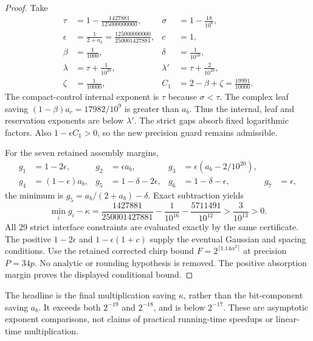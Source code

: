 \begin{proof}
Take
\[
\begin{aligned}
 \tau&=1-\frac{1427881}{125000000000},&\sigma&=1-\frac{18}{10^6},\\
 \epsilon&=\frac1{2+a_b}=\frac{125000000000}{250001427881},&c&=1,\\
 \beta&=\frac1{1000},&\delta&=\frac1{10^{16}},\\
 \lambda&=\tau+\frac1{10^{20}},&\lambda'&=\tau+\frac2{10^{20}},\\
 \zeta&=\frac1{10000},&C_1&=2-\beta+\zeta=\frac{19991}{10000}.
\end{aligned}
\]
The compact-control internal exponent is $\tau$ because $\sigma<\tau$.
The complex leaf saving $(1-\beta)a_c=17982/10^9$ is greater than
$a_b$. Thus the internal, leaf and reservation exponents are below
$\lambda'$. The strict gaps absorb fixed logarithmic factors. Also
$1-\epsilon C_1>0$, so the new precision guard remains admissible.

For the seven retained assembly margins,
\[
\begin{aligned}
 g_1&=1-2\epsilon,&g_2&=\epsilon a_b,&
 g_3&=\epsilon(a_b-2/10^{20}),\\
 g_4&=(1-\epsilon)a_b,&g_5&=1-\delta-2\epsilon,&
 g_6&=1-\delta-\epsilon,&g_7&=\epsilon,
\end{aligned}
\]
the minimum is $g_5=a_b/(2+a_b)-\delta$. Exact subtraction yields
\[
 \min_i g_i-\kappa
 =\frac{1427881}{250001427881}-\frac1{10^{16}}-\frac{5711491}{10^{12}}
 >\frac3{10^{13}}>0.
\]
All 29 strict interface constraints are evaluated exactly by the same
certificate. The positive $1-2\epsilon$ and $1-\epsilon(1+c)$ supply
the eventual Gaussian and spacing conditions. Use the retained corrected
chirp bound $F=2^{\lceil1.14\alpha^2\rceil}$ at precision $P=34p$.
No analytic or rounding hypothesis is removed. The positive absorption
margin proves the displayed conditional bound.
\end{proof}

The headline is the final multiplication saving $\kappa$, rather than
the bit-component saving $a_b$. It exceeds both $2^{-19}$ and $2^{-18}$,
and is below $2^{-17}$. These are asymptotic exponent comparisons, not
claims of practical running-time speedups or linear-time multiplication.
